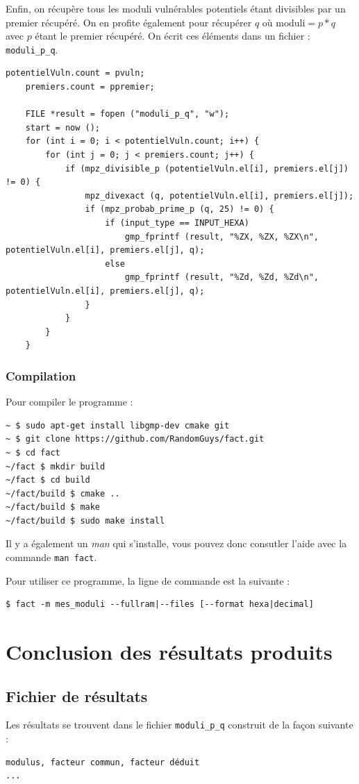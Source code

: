 Enfin, on récupère tous les moduli vulnérables potentiels étant divisibles par un premier récupéré. On en profite également pour récupérer $q$ où $\text{moduli}=p*q$ avec $p$ étant le premier récupéré. On écrit ces éléments dans un fichier : \verb+moduli_p_q+. 
\begin{lstlisting}[style=customc,caption=fact\_superspeed.c - partie 5b, label=fact5]
    	potentielVuln.count = pvuln;
	premiers.count = ppremier;

	FILE *result = fopen ("moduli_p_q", "w");
	start = now ();
	for (int i = 0; i < potentielVuln.count; i++) {
		for (int j = 0; j < premiers.count; j++) {
			if (mpz_divisible_p (potentielVuln.el[i], premiers.el[j]) != 0) {
				mpz_divexact (q, potentielVuln.el[i], premiers.el[j]);
				if (mpz_probab_prime_p (q, 25) != 0) {
					if (input_type == INPUT_HEXA) 
						gmp_fprintf (result, "%ZX, %ZX, %ZX\n", potentielVuln.el[i], premiers.el[j], q);
					else
						gmp_fprintf (result, "%Zd, %Zd, %Zd\n", potentielVuln.el[i], premiers.el[j], q);
				}
			}
		}
	}

\end{lstlisting}






\subsubsection{Compilation}
Pour compiler le programme :
\begin{verbatim}
~ $ sudo apt-get install libgmp-dev cmake git 
~ $ git clone https://github.com/RandomGuys/fact.git
~ $ cd fact
~/fact $ mkdir build
~/fact $ cd build
~/fact/build $ cmake ..
~/fact/build $ make
~/fact/build $ sudo make install
\end{verbatim}

Il y a également un \textit{man} qui s'installe, vous pouvez donc consutler l'aide avec la commande \verb+man fact+.

Pour utiliser ce programme, la ligne de commande est la suivante :
\begin{verbatim}
$ fact -m mes_moduli --fullram|--files [--format hexa|decimal]
\end{verbatim}


\section{Conclusion des résultats produits}

\subsection{Fichier de résultats}
Les résultats se trouvent dans le fichier \verb+moduli_p_q+ construit de la façon suivante :
\begin{verbatim}
modulus, facteur commun, facteur déduit
...
\end{verbatim}
